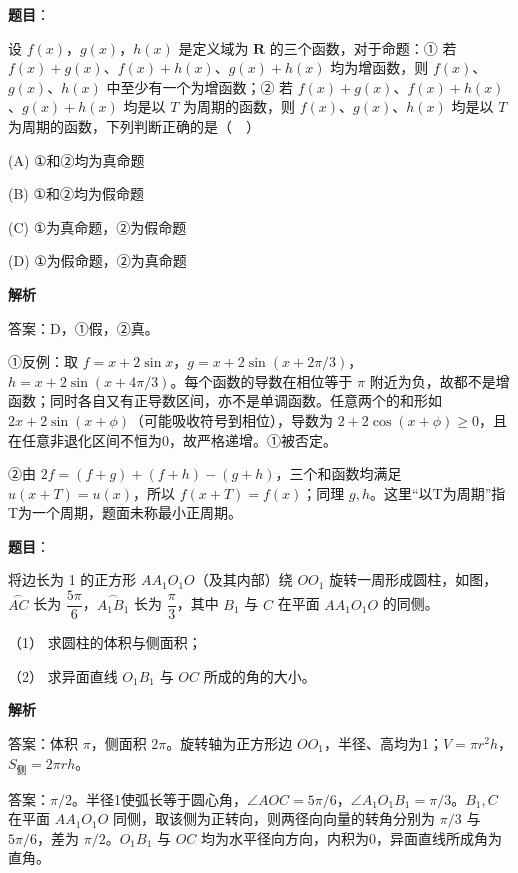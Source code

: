 \begin{answer}

\textbf{题目}：

设 \(f(x)\)，\(g(x)\)，\(h(x)\) 是定义域为 \(\mathbf R\) 的三个函数，对于命题：① 若 \(f(x)+g(x)\)、\(f(x)+h(x)\)、\(g(x)+h(x)\) 均为增函数，则 \(f(x)\)、\(g(x)\)、\(h(x)\) 中至少有一个为增函数；② 若 \(f(x)+g(x)\)、\(f(x)+h(x)\)、\(g(x)+h(x)\) 均是以 \(T\) 为周期的函数，则 \(f(x)\)、\(g(x)\)、\(h(x)\) 均是以 \(T\) 为周期的函数，下列判断正确的是（　）

\noindent(A) ①和②均为真命题

\noindent(B) ①和②均为假命题

\noindent(C) ①为真命题，②为假命题

\noindent(D) ①为假命题，②为真命题

\textbf{解析}

答案：D，①假，②真。

①反例：取 \(f=x+2\sin x\)，\(g=x+2\sin(x+2\pi/3)\)，\(h=x+2\sin(x+4\pi/3)\)。每个函数的导数在相位等于 \(\pi\) 附近为负，故都不是增函数；同时各自又有正导数区间，亦不是单调函数。任意两个的和形如 \(2x+2\sin(x+\phi)\)（可能吸收符号到相位），导数为 \(2+2\cos(x+\phi)\ge0\)，且在任意非退化区间不恒为0，故严格递增。①被否定。

②由 \(2f=(f+g)+(f+h)-(g+h)\)，三个和函数均满足 \(u(x+T)=u(x)\)，所以 \(f(x+T)=f(x)\)；同理 \(g,h\)。这里“以T为周期”指T为一个周期，题面未称最小正周期。


\end{answer}
\begin{answer}

\textbf{题目}：

将边长为 1 的正方形 \(AA_1O_1O\)（及其内部）绕 \(OO_1\) 旋转一周形成圆柱，如图，\(\overset{\frown}{AC}\) 长为 \(\dfrac{5\pi}6\)，\(\overset{\frown}{A_1B_1}\) 长为 \(\dfrac\pi3\)，其中 \(B_1\) 与 \(C\) 在平面 \(AA_1O_1O\) 的同侧。

（1） 求圆柱的体积与侧面积；

（2） 求异面直线 \(O_1B_1\) 与 \(OC\) 所成的角的大小。
\nopagebreak[4]
\begin{center}\end{center}
\nopagebreak[4]
\textbf{解析}


答案：体积 \(\pi\)，侧面积 \(2\pi\)。旋转轴为正方形边 \(OO_1\)，半径、高均为1；\(V=\pi r^2h\)，\(S_{\text{侧}}=2\pi rh\)。


答案：\(\pi/2\)。半径1使弧长等于圆心角，\(\angle AOC=5\pi/6\)，\(\angle A_1O_1B_1=\pi/3\)。\(B_1,C\) 在平面 \(AA_1O_1O\) 同侧，取该侧为正转向，则两径向向量的转角分别为 \(\pi/3\) 与 \(5\pi/6\)，差为 \(\pi/2\)。\(O_1B_1\) 与 \(OC\) 均为水平径向方向，内积为0，异面直线所成角为直角。



\end{answer}
